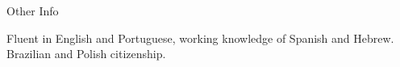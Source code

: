 \begin{cvcontentsection}{Other Info}

Fluent in English and Portuguese, working knowledge of Spanish and Hebrew.
Brazilian and Polish citizenship.

\end{cvcontentsection}
